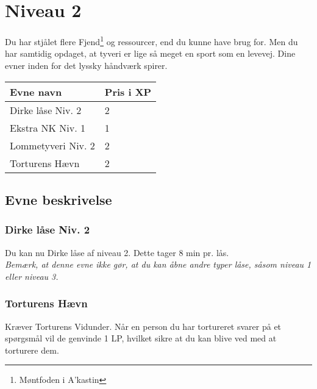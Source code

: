 \chapter{Niveau 2}
Du har stjålet flere Fjend\footnote{Møntfoden i A'kastin} og ressourcer, end du kunne have brug for. Men du har samtidig opdaget, at tyveri er lige så meget en sport som en levevej. Dine evner inden for det lyssky håndværk spirer.

\begin{table}[H]
    \centering
    \begin{tabular}{|p{}|p{}|}
    \rowcolor{cerulean!80}\hline
        Evne navn & Pris i XP \\\hline
         Dirke låse Niv. 2 & 2 \\\hline
         Ekstra NK Niv. 1 & 1 \\\hline
         Lommetyveri Niv. 2 & 2 \\\hline
         Torturens Hævn & 2\\\hline
    \end{tabular}
\end{table}
\section{Evne beskrivelse}

\subsection{Dirke låse Niv. 2}
Du kan nu Dirke låse af niveau 2. Dette tager 8 min pr. lås.\\
\emph{Bemærk, at denne evne ikke gør, at du kan åbne andre typer låse, såsom niveau 1 eller niveau 3.}\\





\subsection{Torturens Hævn}
Kræver Torturens Vidunder. Når en person du har tortureret svarer på et spørgsmål vil de genvinde 1 LP, hvilket sikre at du kan blive ved med at torturere dem. 